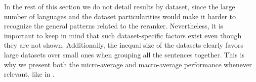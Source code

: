 \documentclass[output=paper
,modfonts
,nonflat]{langsci/langscibook}
\begin{document}
\begin{table}
  \caption{{Reranker-specific performance by number of expressions
      in the gold sequence (all languages).} P/R/F stands for
    precision/recall/f-score; the macro-average performance is the
    average over languages (datasets with NaN F-scores are
    ignored).\label{tab:perfNbExprs}}
\end{table}



In the rest of this section we do not detail results by dataset, since
the large number of languages and the dataset particularities would
make it harder to recognize the general patterns related to the
reranker.
Nevertheless, it is important to keep in mind that such
dataset-specific factors exist even though they are not
shown. Additionally, the inequal size of the datasets clearly favors
large datasets over small ones when grouping all the sentences
together. This is why we present both the micro-average and
macro-average performance whenever relevant, like in .
\end{document}
